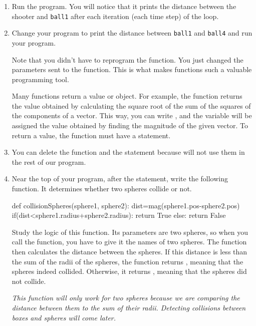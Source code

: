 \begin{enumerate}
\item Run the program. You will notice that it prints the distance between the shooter and \texttt{ball1} after each iteration (each time step) of the loop.

\item Change your program to print the distance between \texttt{ball1} and \texttt{ball4} and run your program. 

Note that you didn't have to reprogram the function. You just changed the parameters sent to the function. This is what makes functions such a valuable programming tool.

Many functions return a value or object. For example, the  function returns the value obtained by calculating the square root of the sum of the squares of the components of a vector. This way, you can write , and the variable  will be assigned the value obtained by finding the magnitude of the given vector. To return a value, the function must have a  statement.

\item You can delete the  function and the  statement because will not use them in the rest of our program.

\item Near the top of your program, after the  statement, write the following function. It determines whether two spheres collide or not.

\begin{myvpython}
def collisionSpheres(sphere1, sphere2):
    dist=mag(sphere1.pos-sphere2.pos)
    if(dist<sphere1.radius+sphere2.radius):
        return True
    else:
        return False
\end{myvpython}

Study the logic of this function. Its parameters are two spheres, so when you call the function, you have to give it the names of two spheres. The function then calculates the distance between the spheres. If this distance is less than the sum of the radii of the spheres, the function returns , meaning that the spheres indeed collided. Otherwise, it returns , meaning that the spheres did not collide. 

\emph{This function will only work for two spheres because we are comparing the distance between them to the sum of their radii. Detecting collisions between boxes and spheres will come later.}


\end{enumerate}
